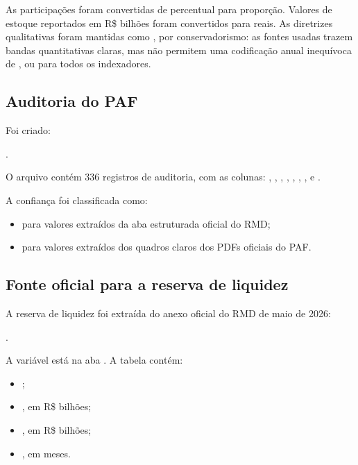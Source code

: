 \documentclass[12pt,a4paper]{article}
\begin{document}
As participações foram convertidas de percentual para proporção. Valores de estoque
reportados em R\$ bilhões foram convertidos para reais. As diretrizes qualitativas
foram mantidas como , por conservadorismo: as fontes usadas trazem
bandas quantitativas claras, mas não permitem uma codificação anual inequívoca de
,  ou  para todos os indexadores.

\subsection{Auditoria do PAF}

Foi criado:
\begin{center}
.
\end{center}

O arquivo contém 336 registros de auditoria, com as colunas:
, , , ,
, , ,
 e .

A confiança foi classificada como:

\begin{itemize}[leftmargin=1.2cm]
    \item {} para valores extraídos da aba estruturada oficial do RMD;
    \item {} para valores extraídos dos quadros claros dos PDFs oficiais
    do PAF.
\end{itemize}

\subsection{Fonte oficial para a reserva de liquidez}

A reserva de liquidez foi extraída do anexo oficial do RMD de maio de 2026:

\begin{center}
.
\end{center}

A variável está na aba . A tabela contém:

\begin{itemize}[leftmargin=1.2cm]
    \item {};
    \item {}, em R\$ bilhões;
    \item {}, em R\$ bilhões;
    \item {}, em meses.
\end{itemize}
\end{document}
